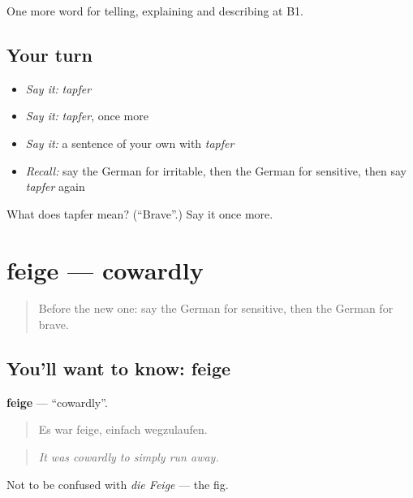 \begin{grammarlens}[title={What you've built}]
One more word for telling, explaining and describing at B1.
\end{grammarlens}

\subsection*{Your turn}
\begin{itemize}
\raggedright
  \item \emph{Say it:} \emph{tapfer}
  \item \emph{Say it:} \emph{tapfer}, once more
  \item \emph{Say it:} a sentence of your own with \emph{tapfer}
  \item \emph{Recall:} say the German for irritable, then the German for sensitive, then say \emph{tapfer} again
\end{itemize}

\begin{tcolorbox}[breakable,colback=teal!4,colframe=teal!35!black,title={Before you move on}]
What does tapfer mean? (\textquotedblleft{}Brave\textquotedblright{}.) Say it once more.
\end{tcolorbox}
\section[feige]{feige — cowardly}

\label{lesson:GE-C477-feige}



\begin{quote}
Before the new one: say the German for sensitive, then the German for brave.
\end{quote}

\subsection*{You'll want to know: feige}
\textbf{feige} — \textquotedblleft{}cowardly\textquotedblright{}.

\begin{quote}
Es war feige, einfach wegzulaufen.
\end{quote}

\begin{quote}
\emph{It was cowardly to simply run away.}
\end{quote}

Not to be confused with \emph{die Feige} — the fig.

